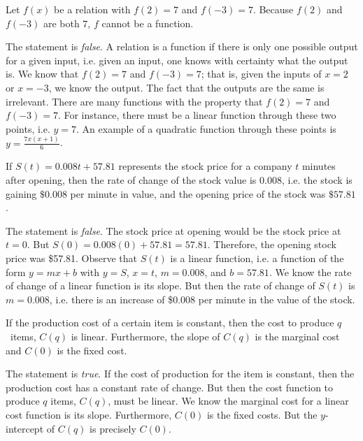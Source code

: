 \documentclass[11pt,letterpaper]{article}
\begin{document}
\thispagestyle{title}

 Let $f(x)$ be a relation with $f(2)= 7$ and $f(-3)= 7$. Because $f(2)$ and $f(-3)$ are both $7$, $f$ cannot be a function. \pspace

\sol The statement is \textit{false}. A relation is a function if there is only one possible output for a given input, i.e. given an input, one knows with certainty what the output is. We know that $f(2)= 7$ and $f(-3)= 7$; that is, given the inputs of $x= 2$ or $x= -3$, we know the output. The fact that the outputs are the same is irrelevant. There are many functions with the property that $f(2)= 7$ and $f(-3)= 7$. For instance, there must be a linear function through these two points, i.e. $y= 7$. An example of a quadratic function through these points is $y= \frac{7x(x + 1)}{6}$. \pvspace{1.3cm}



 If $S(t)= 0.008t + 57.81$ represents the stock price for a company $t$ minutes after opening, then the rate of change of the stock value is $0.008$, i.e. the stock is gaining $\$0.008$ per minute in value, and the opening price of the stock was $\$57.81$. \pspace

\sol The statement is \textit{false}. The stock price at opening would be the stock price at $t= 0$. But $S(0)= 0.008(0) + 57.81= 57.81$. Therefore, the opening stock price was \$57.81. Observe that $S(t)$ is a linear function, i.e. a function of the form $y= mx + b$ with $y= S$, $x= t$, $m= 0.008$, and $b= 57.81$. We know the rate of change of a linear function is its slope. But then the rate of change of $S(t)$ is $m= 0.008$, i.e. there is an increase of \$0.008 per minute in the value of the stock. \pvspace{1.3cm}



 If the production cost of a certain item is constant, then the cost to produce $q$~items, $C(q)$ is linear. Furthermore, the slope of $C(q)$ is the marginal cost and $C(0)$ is the fixed cost. \pspace

\sol The statement is \textit{true}. If the cost of production for the item is constant, then the production cost has a constant rate of change. But then the cost function to produce $q$ items, $C(q)$, must be linear. We know the marginal cost for a linear cost function is its slope. Furthermore, $C(0)$ is the fixed costs. But the $y$-intercept of $C(q)$ is precisely $C(0)$. \pvspace{1.3cm}
\end{document}
